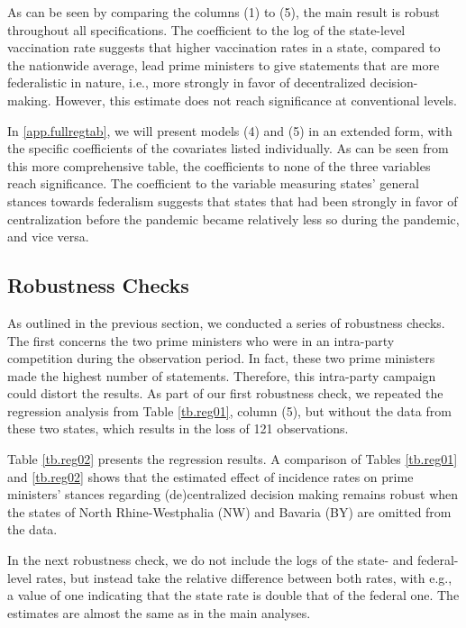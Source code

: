 \documentclass[authoryear,12pt, 3p]{elsarticle} %
\theoremstyle{break}
\begin{document}
As can be seen by comparing the columns (1) to (5), the main result is robust throughout all specifications. The coefficient to the log of the state-level vaccination rate suggests that higher vaccination rates in a state, compared to the nationwide average, lead prime ministers to give statements that are more federalistic in nature, i.e., more strongly in favor of decentralized decision-making. However, this estimate does not reach significance at conventional levels.

In \ref{app.fullregtab}, we will present models (4) and (5) in an extended form, with the specific coefficients of the covariates listed individually. As can be seen from this more comprehensive table, the coefficients to none of the three variables reach significance. The coefficient to the variable measuring states’ general stances towards federalism suggests that states that had been strongly in favor of centralization before the pandemic became relatively less so during the pandemic, and vice versa.

\subsection{Robustness Checks}
As outlined in the previous section, we conducted a series of robustness checks. The first concerns the two prime ministers who were in an intra-party competition during the observation period. In fact, these two prime ministers made the highest number of statements. Therefore, this intra-party campaign could distort the results. As part of our first robustness check, we repeated the regression analysis from  Table \ref{tb.reg01}, column (5), but without the data from these two states, which results in the loss of 121 observations.



Table \ref{tb.reg02} presents the regression results. A comparison of Tables \ref{tb.reg01} and \ref{tb.reg02} shows that the estimated effect of incidence rates on prime ministers’ stances regarding (de)centralized decision making remains robust when the states of North Rhine-Westphalia (NW) and Bavaria (BY) are omitted from the data.

In the next robustness check, we do not include the logs of the state- and federal-level rates, but instead take the relative difference between both rates, with e.g., a value of one indicating that the state rate is double that of the federal one. The estimates are almost the same as in the main analyses.  
\end{document}
